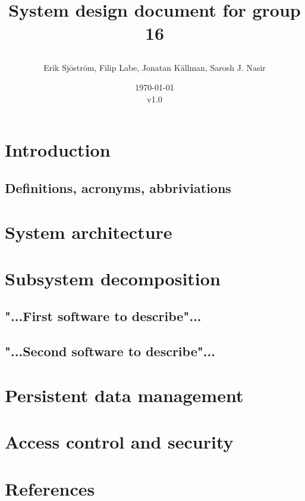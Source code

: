 \documentclass{article}
\title{
    System design document for group 16
    \author{Erik Sjöström,
            Filip Labe,
            Jonatan Källman,
            Sarosh J. Nasir}
    \date{\today \\v1.0}         
}
\begin{document}
\maketitle

\section{Introduction}

\subsection{Definitions, acronyms, abbriviations}

\section{System architecture}

\section{Subsystem decomposition}

\subsection{"...First software to describe"...}

\subsection{"...Second software to describe"...}

\section{Persistent data management}

\section{Access control and security}

\section{References}
\end{document}
